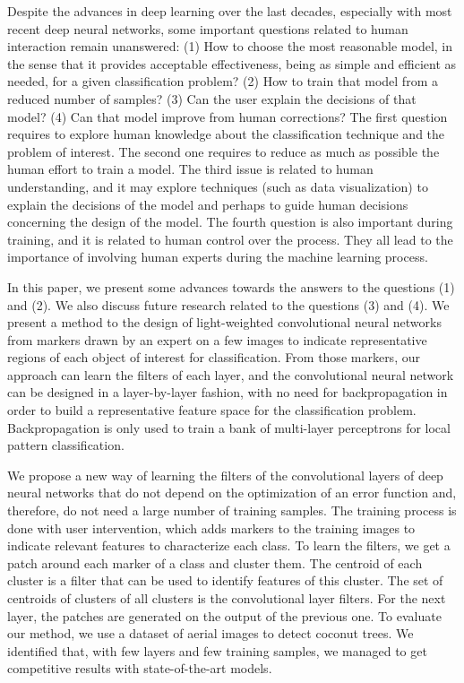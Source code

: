 \documentclass[a4paper,conference]{IEEEtran}
\begin{document}
Despite the advances in deep learning over the last decades, especially with most recent deep neural networks, some important questions related to human interaction remain unanswered: (1) How to choose the most reasonable model, in the sense that it provides acceptable effectiveness, being as simple and efficient as needed, for a given classification problem? (2) How to train that model from a reduced number of samples?  (3) Can the user explain the decisions of that model? (4) Can that model improve from human corrections? The first question requires to explore human knowledge about the classification technique and the problem of interest. The second one requires to reduce as much as possible the human effort to train a model. The third issue is related to human understanding, and it may explore techniques (such as data visualization) to explain the decisions of the model and perhaps to guide human decisions concerning the design of the model. The fourth question is also important during training, and it is related to human control over the process. They all lead to the importance of involving human experts during the machine learning process.

In this paper, we present some advances towards the answers to the questions (1) and (2). We also discuss future research related to the questions (3) and (4). We present a method to the design of light-weighted convolutional neural networks from markers drawn by an expert on a few images to indicate representative regions of each object of interest for classification. From those markers, our approach can learn the filters of each layer, and the convolutional neural network can be designed in a layer-by-layer fashion, with no need for backpropagation in order to build a representative feature space for the classification problem. Backpropagation is only used to train a bank of multi-layer perceptrons for local pattern classification.

We propose a new way of learning the filters of the convolutional layers of deep neural networks that do not depend on the optimization of an error function and, therefore, do not need a large number of training samples. The training process is done with user intervention, which adds markers to the training images to indicate relevant features to characterize each class. To learn the filters, we get a patch around each marker of a class and cluster them. The centroid of each cluster is a filter that can be used to identify features of this cluster. The set of centroids of clusters of all clusters is the convolutional layer filters. For the next layer, the patches are generated on the output of the previous one. To evaluate our method, we use a dataset of aerial images to detect coconut trees. We identified that, with few layers and few training samples, we managed to get competitive results with state-of-the-art models.
\end{document}
